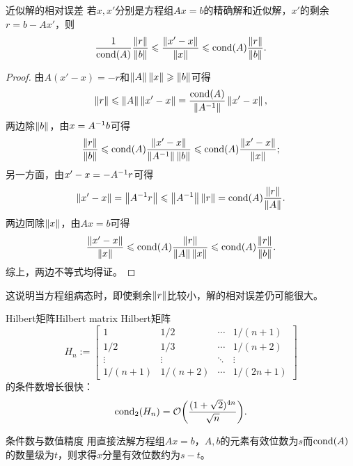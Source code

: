 \begin{theorem}
    {近似解的相对误差}{}
    若$x,x'$分别是方程组$Ax=b$的精确解和近似解，$x'$的剩余$r=b-Ax'$，则
    \begin{equation}
        \frac1{\cond(A)}\frac{\norm r}{\norm b}\leq\frac{\norm{x'-x}}{\norm x}\leq\cond(A)\frac{\norm r}{\norm b}.
    \end{equation}
\end{theorem}

\begin{proof}
    由$A(x'-x)=-r$和$\norm A\norm x\geq\norm b$可得
    \[
        \norm r\leq\norm A\norm{x'-x}=\frac{\cond(A)}{\norm{A\iv}}\norm{x'-x},
    \]
    两边除$\norm b$，由$x=A\iv b$可得 
    \[
        \frac{\norm r}{\norm b}\leq\cond(A)\frac{\norm{x'-x}}{\norm{A\iv}\norm b}\leq\cond(A)\frac{\norm{x'-x}}{\norm x};
    \]
    另一方面，由$x'-x=-A\iv r$可得
    \[
        \norm{x'-x}=\norm{A\iv r}\leq\norm{A\iv}\norm r=\cond(A)\frac{\norm r}{\norm A}.
    \]
    两边同除$\norm x$，由$Ax=b$可得 
    \[
        \frac{\norm{x'-x}}{\norm x}\leq\cond(A)\frac{\norm r}{\norm A\norm x}\leq\cond(A)\frac{\norm r}{\norm b}.
    \]
    综上，两边不等式均得证。
\end{proof}

\begin{remark}
    这说明当方程组病态时，即使剩余$\norm r$比较小，解的相对误差仍可能很大。
\end{remark}

\begin{example}
    {Hilbert矩阵}{Hilbert matrix}
    Hilbert矩阵
    \begin{equation*}
        H_n:=\begin{bmatrix}
            1&1/2&\cdots&1/(n+1)\\
            1/2&1/3&\cdots&1/(n+2)\\
            \vdots&\vdots&\ddots&\vdots\\
            1/(n+1)&1/(n+2)&\cdots&1/(2n+1)
        \end{bmatrix}
    \end{equation*}
    的条件数增长很快：
    \[
        \cond_2(H_n)=\bigo\biggkh{\frac{(1+\sqrt2)^{4n}}{\sqrt n}}.
    \]
\end{example}

\begin{theorem}
    {条件数与数值精度}{}
    用直接法解方程组$Ax=b$，$A,b$的元素有效位数为$s$而$\cond(A)$的数量级为$t$，则求得$x$分量有效位数约为$s-t$。
\end{theorem}

